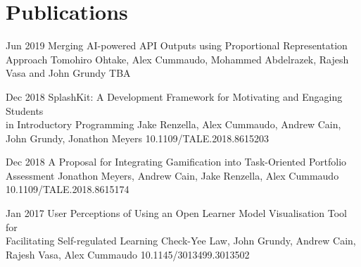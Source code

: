 \section{Publications}

  {Jun 2019}
  {Merging AI-powered API Outputs using Proportional Representation Approach
  }
  {Tomohiro Ohtake, Alex Cummaudo, Mohammed Abdelrazek, Rajesh Vasa and John Grundy}
  {TBA}

  {Dec 2018}
  {SplashKit: A Development Framework for Motivating and Engaging Students\\in Introductory Programming
  }
  {Jake Renzella, Alex Cummaudo, Andrew Cain, John Grundy, Jonathon Meyers}
  {10.1109/TALE.2018.8615203}

\newpage

  {Dec 2018}
  {A Proposal for Integrating Gamification into Task-Oriented Portfolio Assessment
  }
  {Jonathon Meyers, Andrew Cain, Jake Renzella, Alex Cummaudo}
  {10.1109/TALE.2018.8615174}
  
  {Jan 2017}
  {User Perceptions of Using an Open Learner Model Visualisation Tool for\\Facilitating Self-regulated Learning
  }
  {Check-Yee Law, John Grundy, Andrew Cain, Rajesh Vasa, Alex Cummaudo}
  {10.1145/3013499.3013502}